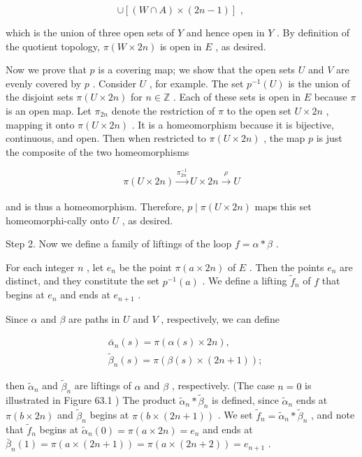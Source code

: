 \[
\cup  \left\lbrack  {\left( {W \cap  A}\right)  \times  \left( {{2n} - 1}\right) }\right\rbrack  \text{ , }
\]

which is the union of three open sets of \(Y\) and hence open in \(Y\) . By definition of the quotient topology, \(\pi \left( {W \times  {2n}}\right)\) is open in \(E\) , as desired.

Now we prove that \(p\) is a covering map; we show that the open sets \(U\) and \(V\) are evenly covered by \(p\) . Consider \(U\) , for example. The set \({p}^{-1}\left( U\right)\) is the union of the disjoint sets \(\pi \left( {U \times  {2n}}\right)\) for \(n \in  \mathbb{Z}\) . Each of these sets is open in \(E\) because \(\pi\) is an open map. Let \({\pi }_{2n}\) denote the restriction of \(\pi\) to the open set \(U \times  {2n}\) , mapping it onto \(\pi \left( {U \times  {2n}}\right)\) . It is a homeomorphism because it is bijective, continuous, and open. Then when restricted to \(\pi \left( {U \times  {2n}}\right)\) , the map \(p\) is just the composite of the two homeomorphisms

\[
\pi \left( {U \times  {2n}}\right) \xrightarrow[]{{\pi }_{2n}^{-1}}U \times  {2n}\overset{\rho }{ \rightarrow  }U
\]

and is thus a homeomorphism. Therefore, \(p \mid  \pi \left( {U \times  {2n}}\right)\) maps this set homeomorphi-cally onto \(U\) , as desired.

Step 2. Now we define a family of liftings of the loop \(f = \alpha  * \beta\) .

For each integer \(n\) , let \({e}_{n}\) be the point \(\pi \left( {a \times  {2n}}\right)\) of \(E\) . Then the points \({e}_{n}\) are distinct, and they constitute the set \({p}^{-1}\left( a\right)\) . We define a lifting \({\widetilde{f}}_{n}\) of \(f\) that begins at \({e}_{n}\) and ends at \({e}_{n + 1}\) .

Since \(\alpha\) and \(\beta\) are paths in \(U\) and \(V\) , respectively, we can define

\[
\begin{aligned}  & {\bar{\alpha }}_{n}\left( s\right)  = \pi \left( {\alpha \left( s\right)  \times  {2n}}\right) , \\  & {\widetilde{\beta }}_{n}\left( s\right)  = \pi \left( {\beta \left( s\right)  \times  \left( {{2n} + 1}\right) }\right) ; \end{aligned}
\]

then \({\widetilde{\alpha }}_{n}\) and \({\widetilde{\beta }}_{n}\) are liftings of \(\alpha\) and \(\beta\) , respectively. (The case \(n = 0\) is illustrated in Figure 63.1 ) The product \({\widetilde{\alpha }}_{n} * {\widetilde{\beta }}_{n}\) is defined, since \({\widetilde{\alpha }}_{n}\) ends at \(\pi \left( {b \times  {2n}}\right)\) and \({\widetilde{\beta }}_{n}\) begins at \(\pi \left( {b \times  \left( {{2n} + 1}\right) }\right)\) . We set \({\widetilde{f}}_{n} = {\widetilde{\alpha }}_{n} * {\widetilde{\beta }}_{n}\) , and note that \({\widetilde{f}}_{n}\) begins at \({\widetilde{\alpha }}_{n}\left( 0\right)  = \pi \left( {a \times  {2n}}\right)  = {e}_{n}\) and ends at \({\bar{\beta }}_{n}\left( 1\right)  = \pi \left( {a \times  \left( {{2n} + 1}\right) }\right)  = \pi \left( {a \times  \left( {{2n} + 2}\right) }\right)  = {e}_{n + 1}\) .

